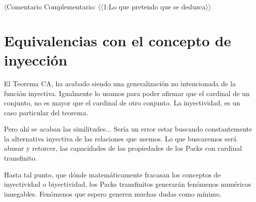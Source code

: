 $\langle$Comentario Complementario: $\langle\langle$1:Lo que pretendo que se deduzca$\rangle\rangle$

\newpage
\section{Equivalencias con el concepto de inyección}

El Teorema CA, ha acabado siendo una generalización no intencionada de la función inyectiva. Igualmente lo usamos para poder afirmar que el cardinal de un conjunto, no es mayor que el cardinal de otro conjunto. La inyectividad, es un caso particular del teorema.

Pero ahí se acaban las similitudes... Sería un error estar buscando constantemente la alternativa inyectiva de las relaciones que usemos. Lo que buscaremos será abusar y retorcer, las capacidades de las propiedades de los Packs con cardinal transfinito.

Hasta tal punto, que dónde matemáticamente fracasan los conceptos de inyectividad o biyectividad, los Packs transfinitos generarán fenómenos numéricos innegables. Fenómenos que espero generen muchas dudas como mínimo.